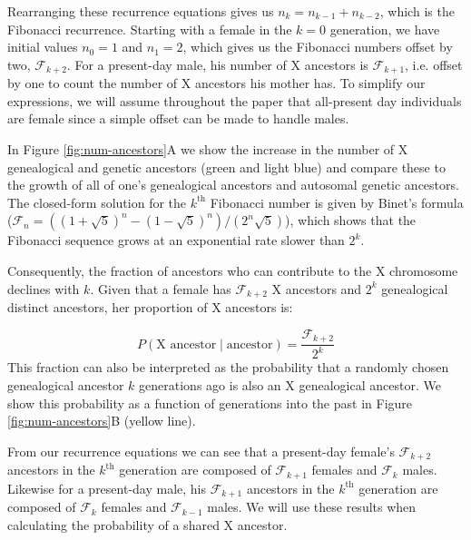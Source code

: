 \documentclass[9pt,twocolumn,twoside]{gsajnl}
\begin{document}
Rearranging these recurrence equations gives us $n_k = n_{k-1} + n_{k-2}$,
which is the Fibonacci recurrence. Starting with a female in the $k=0$
generation, we have initial values $n_0=1$ and $n_1 = 2$, which gives us the
Fibonacci numbers offset by two, $\mathcal{F}_{k+2}$. For a present-day male,
his number of X ancestors is $\mathcal{F}_{k+1}$, i.e. offset by one to count
the number of X ancestors his mother has. To simplify our expressions, we will
assume throughout the paper that all-present day individuals are female since a
simple offset can be made to handle males.



In Figure \ref{fig:num-ancestors}A we show the increase in the number of X
genealogical and genetic ancestors (green and light blue) and compare these to
the growth of all of one's genealogical ancestors and autosomal genetic
ancestors. The closed-form solution for the $k^\text{th}$ Fibonacci number is
given by Binet's formula ($\mathcal{F}_n = ((1 + \sqrt{5})^n - (1 -
\sqrt{5})^n)/(2^n \sqrt{5})$), which shows that the Fibonacci sequence grows at
an exponential rate slower than $2^k$. 

Consequently, the fraction of ancestors who can contribute to the X chromosome
declines with $k$. Given that a female has $\mathcal{F}_{k+2}$ X ancestors and
$2^k$ genealogical distinct ancestors, her proportion of X ancestors is:

\begin{equation}
  \label{eq:prob-x-anc}
  P(\text{X ancestor} \;|\; \text{ancestor}) = \frac{\mathcal{F}_{k+2}}{2^k} 
\end{equation}
%
This fraction can also be interpreted as the probability that a randomly chosen
genealogical ancestor $k$ generations ago is also an X genealogical ancestor.
We show this probability as a function of generations into the past in Figure
\ref{fig:num-ancestors}B (yellow line).

From our recurrence equations we can see that a present-day female's
$\mathcal{F}_{k+2}$ ancestors in the $k^\text{th}$ generation are composed of
$\mathcal{F}_{k+1}$ females and $\mathcal{F}_{k}$ males. Likewise for a
present-day male, his $\mathcal{F}_{k+1}$ ancestors in the $k^\text{th}$
generation are composed of $\mathcal{F}_{k}$ females and $\mathcal{F}_{k-1}$
males. We will use these results when calculating the probability of a shared X
ancestor.
\end{document}
